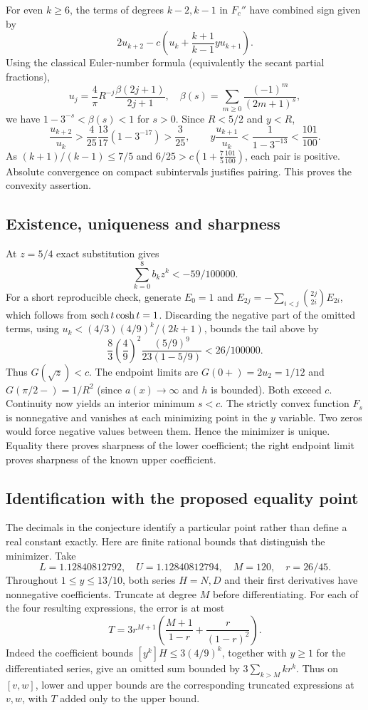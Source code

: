 \documentclass[11pt,a4paper]{article}
\begin{document}
For even $k\ge6$, the terms of degrees $k-2,k-1$ in $F_c''$ have combined sign given by
\[
 2u_{k+2}-c\left(u_k+\frac{k+1}{k-1}yu_{k+1}\right).
\]
Using the classical Euler-number formula (equivalently the secant partial fractions),
\[
 u_j=\frac4\pi R^{-j}\frac{\beta(2j+1)}{2j+1},\quad
 \beta(s)=\sum_{m\ge0}\frac{(-1)^m}{(2m+1)^s},
\]
we have $1-3^{-s}<\beta(s)<1$ for $s>0$. Since $R<5/2$ and $y<R$,
\[
 \frac{u_{k+2}}{u_k}>\frac4{25}\frac{13}{17}(1-3^{-17})>\frac3{25},\qquad
 y\frac{u_{k+1}}{u_k}<\frac1{1-3^{-13}}<\frac{101}{100}.
\]
As $(k+1)/(k-1)\le7/5$ and $6/25>c(1+\tfrac75\tfrac{101}{100})$, each pair is positive. Absolute convergence on compact subintervals justifies pairing. This proves the convexity assertion.

\subsection*{Existence, uniqueness and sharpness}
At $z=5/4$ exact substitution gives
\[
 \sum_{k=0}^8 b_kz^k<-59/100000 .
\]
For a short reproducible check, generate $E_0=1$ and
$E_{2j}=-\sum_{i<j}\binom{2j}{2i}E_{2i}$, which follows from $\operatorname{sech} t\cosh t=1$. Discarding the negative part of the omitted terms, using $u_k<(4/3)(4/9)^k/(2k+1)$, bounds the tail above by
\[
 \frac83\left(\frac49\right)^2\frac{(5/9)^9}{23(1-5/9)}<26/100000 .
\]
Thus $G(\sqrt z)<c$. The endpoint limits are $G(0+)=2u_2=1/12$ and $G(\pi/2-)=1/R^2$ (since $a(x)\to\infty$ and $h$ is bounded). Both exceed $c$. Continuity now yields an interior minimum $s<c$. The strictly convex function $F_s$ is nonnegative and vanishes at each minimizing point in the $y$ variable. Two zeros would force negative values between them. Hence the minimizer is unique. Equality there proves sharpness of the lower coefficient; the right endpoint limit proves sharpness of the known upper coefficient.


\subsection*{Identification with the proposed equality point}
The decimals in the conjecture identify a particular point rather than define a real constant exactly. Here are finite rational bounds that distinguish the minimizer. Take
\[
 L=1.12840812792,\quad U=1.12840812794,\quad M=120,\quad r=26/45 .
\]
Throughout $1\le y\le13/10$, both series $H=N,D$ and their first derivatives have nonnegative coefficients. Truncate at degree $M$ before differentiating. For each of the four resulting expressions, the error is at most
\[
 T=3r^{M+1}\left(\frac{M+1}{1-r}+\frac r{(1-r)^2}\right).
\]
Indeed the coefficient bounds $[y^k]H\le3(4/9)^k$, together with $y\ge1$ for the differentiated series, give an omitted sum bounded by $3\sum_{k>M}kr^k$. Thus on $[v,w]$, lower and upper bounds are the corresponding truncated expressions at $v,w$, with $T$ added only to the upper bound.
\end{document}
